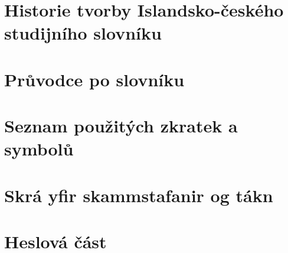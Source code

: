 
\chapter{Historie tvorby Islandsko-českého studijního slovníku}
\longtitleskip



\chapter{Průvodce po slovníku}
\begin{multicols}{2}

\end{multicols}


\chapter{Seznam použitých zkratek a symbolů}
\begin{multicols}{2}
\begin{description}%

\end{description}
\end{multicols}

\chapter{Skrá yfir skammstafanir og tákn}
\begin{multicols}{2}
\begin{description}%

\end{description}
\end{multicols}


\chapter{Heslová část}

